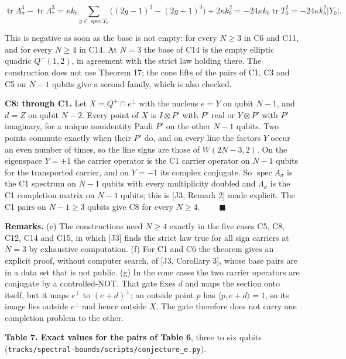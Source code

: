 \documentclass[11pt,a4paper]{article}
\begin{document}
\[\operatorname{tr}\Lambda_\sigma^3-\operatorname{tr}\Lambda_\tau^3
=\kappa k_b\sum_{g\in\operatorname{spec}T_0}\bigl((2g-1)^3-(2g+1)^3\bigr)+2\kappa k_b^2
=-24\kappa k_b\operatorname{tr}T_0^2=-24\kappa k_b^2\lvert Y_0\rvert.
\tag{E12}\]

This is negative as soon as the base is not empty: for every \(N\ge3\) in C6 and C11, and for every
\(N\ge4\) in C14. At \(N=3\) the base of C14 is the empty elliptic quadric \(Q^-(1,2)\), in agreement with the
strict law holding there. The construction does not use Theorem 17; the cone lifts of the pairs of C1,
C3 and C5 on \(N-1\) qubits give a second family, which is also checked.

\textbf{C8: through C1.} Let \(X=Q^+\cap e^\perp\) with the nucleus \(e=Y\) on qubit \(N-1\), and \(d=Z\) on qubit
\(N-2\). Every point of \(X\) is \(I\otimes P'\) with \(P'\) real or \(Y\otimes P'\) with \(P'\) imaginary, for a unique
nonidentity Pauli \(P'\) on the other \(N-1\) qubits. Two points commute exactly when their \(P'\) do, and on
every line the factors \(Y\) occur an even number of times, so the line signs are those of
\(W(2N-3,2)\). On the eigenspace \(Y=+1\) the carrier operator is the C1 carrier operator on \(N-1\) qubits for
the transported carrier, and on \(Y=-1\) its complex conjugate. So \(\operatorname{spec}A_\sigma\) is the C1
spectrum on \(N-1\) qubits with every multiplicity doubled and \(\Lambda_\sigma\) is the C1 completion matrix on \(N-1\) qubits; this is
{[}J3, Remark 2{]} made explicit. The C1 pairs on \(N-1\ge3\) qubits give C8 for every \(N\ge4\).
\(\qquad\blacksquare\)

\textbf{Remarks.} (e) The constructions need \(N\ge4\) exactly in the five cases C5, C8, C12, C14 and C15, in
which {[}J3{]} finds the strict law true for all sign carriers at \(N=3\) by exhaustive computation.
(f) For C1 and C6 the theorem gives an explicit proof, without computer search, of {[}J3, Corollary 3{]},
whose base pairs are in a data set that is not public. (g) In the cone cases the two carrier operators
are conjugate by a controlled-NOT. That gate fixes \(d\) and maps the section onto itself, but it maps
\(e^\perp\) to \((e+d)^\perp\); an outside point \(p\) has \(\langle p,e+d\rangle=1\), so its image lies outside \(e^\perp\)
and hence outside \(X\). The gate therefore does not carry one completion problem to the other.

\textbf{Table 7. Exact values for the pairs of Table 6}, three to six qubits (\nolinkurl{tracks/spectral-bounds/scripts/conjecture_e.py}).
\end{document}
